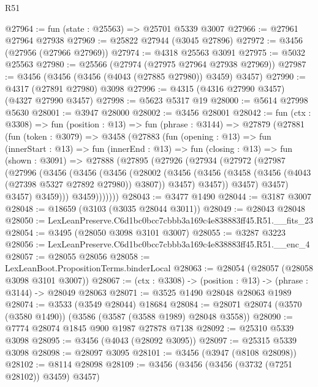 \begin{lexlean}{R51}
\begin{coremodule}
@27964 := fun (state : @25563) => @25701 @5339 @3007
@27966 := @27961 @27964 @27938
@27969 := @25822 @27944 (@3045 @27896)
@27972 := @3456 (@27956 (@27966 @27969))
@27974 := @4318 @25563 @3091
@27975 := @5032 @25563
@27980 := @25566 (@27974 (@27975 @27964 @27938 @27969))
@27987 := @3456 (@3456 (@3456 (@4043 (@27885 @27980)) @3459) @3457)
@27990 := @4317 (@27891 @27980) @3098
@27996 := @4315 (@4316 @27990 @3457) (@4327 @27990 @3457)
@27998 := @5623 @5317 @19
@28000 := @5614 @27998 @5630
@28001 := @3947 @28000
@28002 := @3456 @28001
@28042 := fun (ctx : @3308) =>
  fun (position : @13) =>
  fun (phrase : @3144) =>
  @27879
    (@27881
      (fun (token : @3079) =>
      @3458
        (@27883
          (fun (opening : @13) =>
          fun (innerStart : @13) =>
          fun (innerEnd : @13) =>
          fun (closing : @13) =>
          fun (shown : @3091) =>
          @27888
            (@27895
              (@27926
                (@27934
                  (@27972
                    (@27987
                      (@27996
                        (@3456
                          (@3456
                            (@3456
                              (@28002
                                (@3456
                                  (@3456
                                    (@3458 (@3456 (@4043 (@27398 @5327 @27892 @27980)) @3807))
                                    @3457)
                                  @3457))
                              @3457)
                            @3457)
                          @3457)
                        @3459)))
                  @3459)))))))
@28043 := @3477 @1490
@28044 := @3187 @3007
@28048 := @18659 (@3103 (@3035 @28044 @3011))
@28049 := @28043 @28048
@28050 := LexLeanPreserve.C6d1bc0bcc7cbbb3a169c4e838883ff45.R51.__fits_23
@28054 := @3495 (@28050 @3098 @3101 @3007)
@28055 := @3287 @3223
@28056 := LexLeanPreserve.C6d1bc0bcc7cbbb3a169c4e838883ff45.R51.__enc_4
@28057 := @28055 @28056
@28058 := LexLeanBoot.PropositionTerms.binderLocal
@28063 := @28054 (@28057 (@28058 @3098 @3101 @3007))
@28067 := (ctx : @3308) -> (position : @13) -> (phrase : @3144) -> @28049 @28063
@28071 := @3525 @1490 @28048 @28063 @1989
@28074 := @3533 (@3549 @28044) @18684
@28084 := @28071 @28074 (@3570 (@3580 @1490)) (@3586 (@3587 (@3588 @1989) @28048 @3558))
@28090 := @7774 @28074 @1845 @900 @1987 @27878 @7138
@28092 := @25310 @5339 @3098
@28095 := @3456 (@4043 (@28092 @3095))
@28097 := @25315 @5339 @3098
@28098 := @28097 @3095
@28101 := @3456 (@3947 (@8108 @28098))
@28102 := @8114 @28098
@28109 := @3456 (@3456 (@3456 (@3732 (@7251 @28102)) @3459) @3457)

\end{coremodule}
\end{lexlean}
